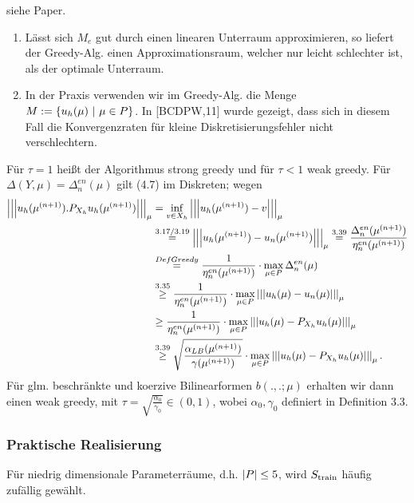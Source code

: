  siehe Paper.

\begin{enumerate}[(1)]
	\item Lässt sich $M_e$ gut durch einen linearen Unterraum approximieren, so liefert der Greedy-Alg. einen Approximationsraum, welcher nur leicht schlechter ist, als der optimale Unterraum.
	\item In der Praxis verwenden wir im Greedy-Alg. die Menge $M:=\left\{u_h(\mu)~|~ \mu \in P\right\}$.
	In [BCDPW,11] wurde gezeigt, dass sich in diesem Fall die Konvergenzraten für kleine Diskretisierungsfehler nicht verschlechtern.
\end{enumerate}

Für $\tau = 1$ heißt der Algorithmus strong greedy und für $\tau <1$ weak greedy.
Für $\Delta(Y,\mu)= \Delta_n^{en}(\mu)$ gilt (4.7) im Diskreten; wegen
\begin{align*}
\left|\left|\left|u_h(\mu^{(n+1)}).P_{X_h} u_h(\mu^{(n+1)})\right|\right|\right|_\mu &= \inf\limits_{v\in X_h} \left|\left|\left|u_h(\mu^{(n+1)})-v\right|\right|\right|_\mu\\
&\stackrel{3.17/3.19}{=} \left|\left|\left|u_h(\mu^{(n+1)})-u_n(\mu^{(n+1)})\right|\right|\right|_\mu \stackrel{3.39}{=} \frac{\Delta_n^{en}(\mu^{(n+1)})}{\eta_n^{en}(\mu^{(n+1)})}\\
&\stackrel{Def Greedy}{=} \frac{1}{\eta_n^{en}(\mu^{(n+1)})}\cdot \max\limits_{\mu\in P} \Delta_n^{en}(\mu)\\
&\stackrel{3.35}{\ge} \frac{1}{\eta_n^{en}(\mu^{(n+1)})}\cdot \max\limits_{\mu\in P} \left|\left|\left|u_h(\mu)-u_n(\mu)\right|\right|\right|_\mu\\
&\ge \frac{1}{\eta_n^{en}(\mu^{(n+1)})}\cdot \max\limits_{\mu\in P} \left|\left|\left|u_h(\mu)-P_{X_h} u_h(\mu)\right|\right|\right|_\mu\\
&\stackrel{3.39}{\ge} \sqrt{\frac{\alpha_{LB}(\mu^{(n+1)})}{\gamma(\mu^{(n+1)})}} \cdot \max\limits_{\mu\in P} \left|\left|\left|u_h(\mu)-P_{X_h} u_h(\mu)\right|\right|\right|_\mu.
\end{align*}
Für glm. beschränkte und koerzive Bilinearformen $b(.,.;\mu)$ erhalten wir dann einen weak greedy, mit $\tau = \sqrt{\frac{\alpha_0}{\gamma_0}}\in (0,1)$, wobei $\alpha_0,\gamma_0$ definiert in Definition 3.3.

\subsubsection{Praktische Realisierung}

Für niedrig dimensionale Parameterräume, d.h. $\left\vert P\right\vert\le 5$, wird $S_{\operatorname{train}}$ häufig zufällig gewählt.

